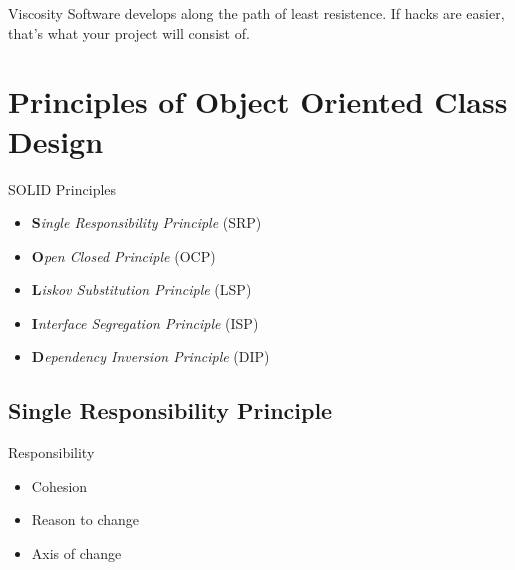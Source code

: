 \documentclass[xcolor=svgnames, handout]{beamer}
\begin{document}

{%
%
\begin{frame}{Viscosity}
    Software develops along the path of least resistence.  If hacks are easier,
            that's what your project will consist of.
\end{frame}
}


\section[Class Design]{Principles of Object Oriented Class Design}


\begin{frame}{\secname}
    SOLID Principles
    \begin{itemize}
        \pause \item \textbf{S}\textit{ingle Responsibility Principle} (SRP)
        \pause \item \textbf{O}\textit{pen Closed Principle} (OCP)
        \pause \item \textbf{L}\textit{iskov Substitution Principle} (LSP)
        \pause \item \textbf{I}\textit{nterface Segregation Principle} (ISP)
        \pause \item \textbf{D}\textit{ependency Inversion Principle} (DIP)
    \end{itemize}
\end{frame}


\subsection{Single Responsibility Principle}


\begin{frame}{\subsecname}

    Responsibility
    \begin{itemize}
        \pause \item Cohesion
        \pause \item Reason to change
        \pause \item Axis of change
    \end{itemize}

\end{frame}
\end{document}
